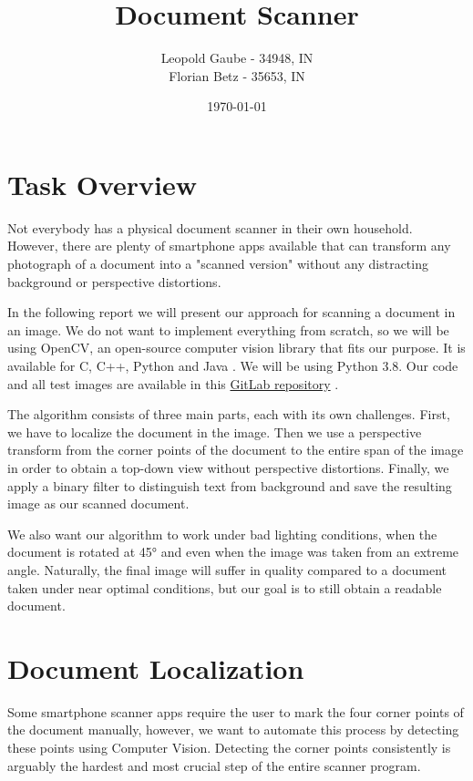\documentclass[bibliography=totoc]{scrartcl}
\title{Document Scanner}
\author{Leopold Gaube - 34948, IN \\ Florian Betz - 35653, IN}
\date{\today}
\begin{document}
\maketitle
\tableofcontents

\clearpage

\section{Task Overview}
Not everybody has a physical document scanner in their own household.
However, there are plenty of smartphone apps available that can transform any photograph of a document into a "scanned version" without any distracting background or perspective distortions.

In the following report we will present our approach for scanning a document in an image.
We do not want to implement everything from scratch, so we will be using \acs{OpenCV}, an open-source computer vision library that fits our purpose.
It is available for C, C++, Python and Java \cite{OpenCV}.
We will be using Python 3.8. Our code and all test images are available in this \href{https://gitlab.com/gaubeleo/document-scanner}{GitLab repository} \cite{Gitlab}.

The algorithm consists of three main parts, each with its own challenges.
First, we have to localize the document in the image.
Then we use a perspective transform from the corner points of the document to the entire span of the image in order to obtain a top-down view without perspective distortions.
Finally, we apply a binary filter to distinguish text from background and save the resulting image as our scanned document.

We also want our algorithm to work under bad lighting conditions, when the document is rotated at 45° and even when the image was taken from an extreme angle.
Naturally, the final image will suffer in quality compared to a document taken under near optimal conditions, but our goal is to still obtain a readable document.

\section{Document Localization}
Some smartphone scanner apps require the user to mark the four corner points of the document manually, however, we want to automate this process by detecting these points using Computer Vision.
Detecting the corner points consistently is arguably the hardest and most crucial step of the entire scanner program.
\end{document}
